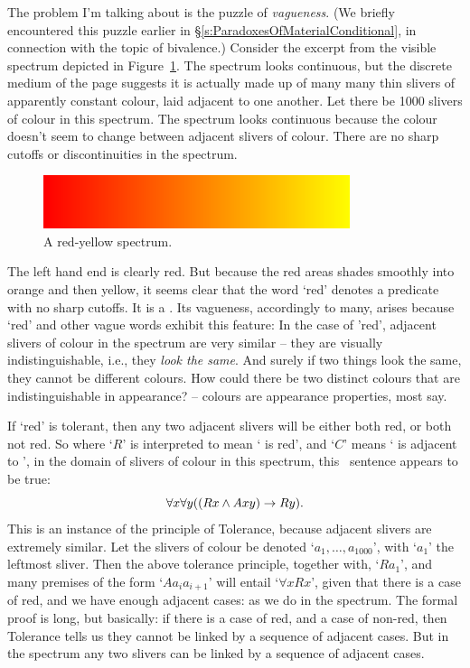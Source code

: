 The problem I'm talking about is the puzzle of \emph{vagueness}. (We briefly encountered this puzzle earlier in §\ref{s:ParadoxesOfMaterialConditional}, in connection with the topic of bivalence.) Consider the excerpt from the visible spectrum depicted in Figure~\ref{spectrum}. The spectrum looks continuous, but the discrete medium of the page suggests it is actually made up of many many thin slivers of apparently constant colour, laid adjacent to one another. Let there be 1000 slivers of colour in this spectrum. The spectrum looks continuous because the colour doesn't seem to change between adjacent slivers of colour. There are no sharp cutoffs or discontinuities in the spectrum.

\begin{figure}
\centering
\includegraphics[keepaspectratio,width=0.8\textwidth]{spectrum.png}
\caption{A red-yellow spectrum. \label{spectrum}}
\end{figure}

The left hand end is clearly red. But because the red areas shades smoothly into orange and then yellow, it seems clear that the word `red' denotes a predicate with no sharp cutoffs. It is a . Its vagueness, accordingly to many, arises because `red' and other vague words exhibit this feature: 
In the case of 'red', adjacent slivers of colour in the spectrum are very similar – they are visually indistinguishable, i.e., they \emph{look the same}. And surely if two things look the same, they cannot be different colours. How could there be two distinct colours that are indistinguishable in appearance? – colours are appearance properties, most say.

If `red' is tolerant, then any two adjacent slivers will be either both red, or both not red.  So where `$R$' is interpreted to mean ` is red', and `$C$' means ` is adjacent to ', in the domain of slivers of colour in this spectrum, this \FOL\ sentence appears to be true: 
     $$\forall x \forall y ((Rx \wedge Axy) \rightarrow Ry).$$
This is an instance of the principle of Tolerance, because adjacent slivers are extremely similar. Let the slivers of colour be denoted `$a_{1},…,a_{1000}$', with `$a_{1}$' the leftmost sliver. Then the above tolerance principle, together with, `$Ra_{1}$', and many premises of the form `$Aa_{i}a_{i+1}$' will entail `$\forall x Rx$', given that there is a case of red, and we have enough adjacent cases: as we do in the spectrum.  The formal proof is long, but basically: if there is a case of red, and a case of non-red, then Tolerance tells us they cannot be linked by a sequence of adjacent cases. But in the spectrum any two slivers can be linked by a sequence of adjacent cases. 


